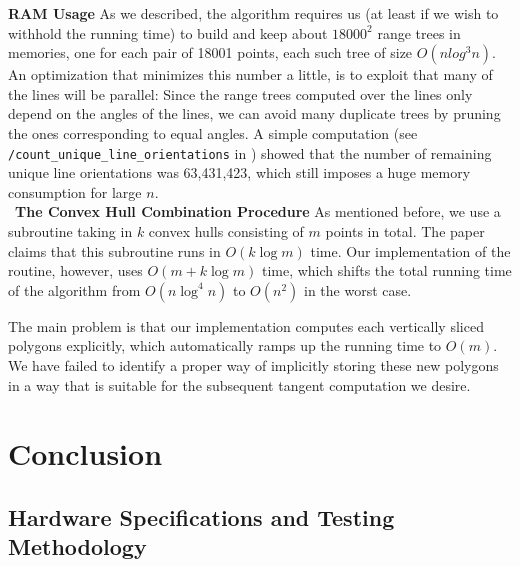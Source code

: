 \documentclass{article}
\begin{document}
\textbf{RAM Usage} As we described, the algorithm requires us (at least if we wish to withhold the running time) to build and keep about $18000^2$ range trees in memories, one for each pair of 18001 points, each such tree of size $O(n log^3 n)$. An optimization that minimizes this number a little, is to exploit that many of the lines will be parallel: Since the range trees computed over the lines only depend on the angles of the lines, we can avoid many duplicate trees by pruning the ones corresponding to equal angles. A simple computation (see \texttt{/count\_unique\_line\_orientations} in \cite{hm18}) showed that the number of remaining unique line orientations was 63,431,423, which still imposes a huge memory consumption for large $n$.
\\ \
\textbf{The Convex Hull Combination Procedure} As mentioned before, we use a subroutine taking in $k$ convex hulls consisting of $m$ points in total. The paper claims that this subroutine runs in $O(k \log m)$ time. Our implementation of the routine, however, uses $O(m + k\log m)$ time, which shifts the total running time of the algorithm from $O(n \log^4 n)$ to $O(n^2)$ in the worst case.

The main problem is that our implementation computes each vertically sliced polygons explicitly, which automatically ramps up the running time to $O(m)$. We have failed to identify a proper way of implicitly storing these new polygons in a way that is suitable for the subsequent tangent computation we desire. 
\section{Conclusion}




\begin{appendices}
    \section{Hardware Specifications and Testing Methodology} \label{apdxSpecs}
\end{appendices}
\end{document}
